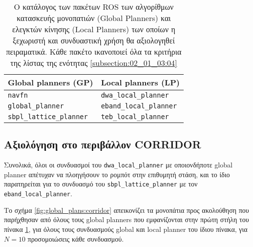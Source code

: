 \begin{table}[h]\centering
\begin{tabular}{l|l}
  Global planners (GP) & Local planners (LP) \\ \toprule
  \texttt{navfn} & \texttt{dwa\_local\_planner} \\
  \texttt{global\_planner} & \texttt{eband\_local\_planner} \\
  \texttt{sbpl\_lattice\_planner} & \texttt{teb\_local\_planner} \\ \bottomrule
\end{tabular}
  \caption{\small Ο κατάλογος των πακέτων ROS των αλγορίθμων κατασκευής
           μονοπατιών (Global Planners) και ελεγκτών κίνησης (Local Planners)
           των οποίων η ξεχωριστή και συνδυαστική χρήση θα αξιολογηθεί
           πειραματικά. Κάθε πακέτο ικανοποιεί όλα τα κριτήρια της λίστας
           της ενότητας \ref{subsection:02_01_03:04}}
\label{tbl:planners_sifted_list}
\end{table}


\subsection{Αξιολόγηση στο περιβάλλον CORRIDOR}
\label{subsection:02_01_04:02}

Συνολικά, όλοι οι συνδυασμοί του \texttt{dwa\_local\_planner} με οποιονδήποτε
global planner απέτυχαν να πλοηγήσουν το ρομπότ στην επιθυμητή στάση, και το
ίδιο παρατηρείται για το συνδυασμό του \texttt{sbpl\_lattice\_planner} με τον
\texttt{eband\_local\_planner}.

Το σχήμα \ref{fig:global_plans:corridor} απεικονίζει τα μονοπάτια προς
ακολούθηση που παρήχθησαν από όλους τους global planners που εμφανίζονται στην
πρώτη στήλη του πίνακα \ref{tbl:planners_sifted_list}, για όλους τους
συνδυασμούς global και local planner του ίδιου πίνακα, για $N=10$ προσομοιώσεις
κάθε συνδυασμού.

